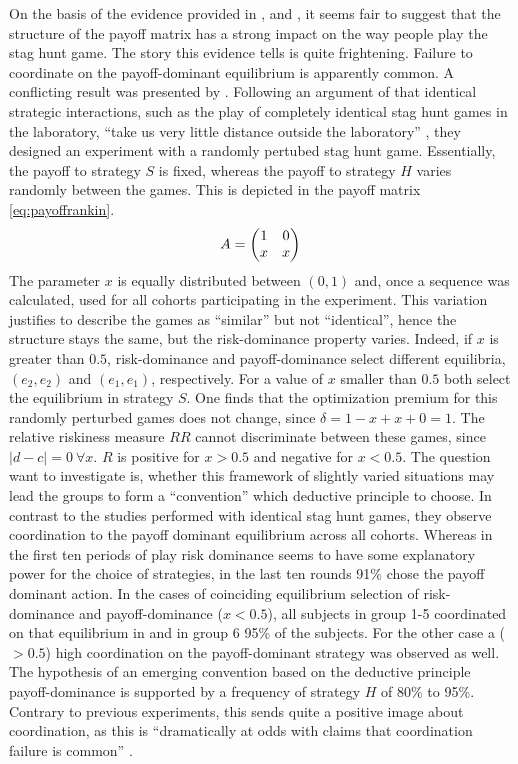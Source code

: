 On the basis of the evidence provided in \textcite{battalio_optimization_2001},
\textcite{schmidt_playing_2003} and \textcite{dubois_optimization_2012},
it seems fair to suggest that the structure of the payoff matrix has a 
strong impact on the way people play the stag hunt game.   
The story this evidence tells is quite frightening. Failure to coordinate 
on the payoff-dominant equilibrium is apparently common. 
A conflicting result was presented by \textcite{rankin_strategic_2000}.
Following an argument of \textcite{kreps_game_1990} that identical strategic 
interactions, such as the play of completely identical stag hunt games 
in the laboratory, ``take us very little distance outside the laboratory'' 
\parencite[212]{kreps_game_1990}, 
they designed an experiment with a randomly 
pertubed stag hunt game. Essentially, the payoff to strategy $S$ is fixed, 
whereas the payoff to strategy $H$ varies randomly between the games. This is
depicted in the payoff matrix  \eqref{eq:payoffrankin}.
\begin{align}
        \label{eq:payoffrankin}
        A = \mqty(1 & 0 \\ x & x)
\end{align}        
The parameter $x$ is equally distributed between $(0,1)$ and, once a sequence
was calculated, used for all cohorts participating in the experiment. This
variation justifies to describe the games as ``similar'' but not
``identical'', hence the structure stays the same, but the risk-dominance 
property varies. Indeed, if $x$ is greater than $0.5$, risk-dominance and
payoff-dominance select different equilibria, $(e_2,e_2)$ and $(e_1,e_1)$,
respectively. For a value of $x$ smaller than $0.5$ both select 
the equilibrium in strategy $S$. One finds that the optimization premium for 
this randomly perturbed games does not change, since $\delta=1-x+x+0=1$. 
The relative riskiness measure $RR$ cannot discriminate between these games,
since $|d-c|=0\ \forall x$. $R$ is positive for $x > 0.5$ and 
negative for $x <0.5$. The question \textcite{rankin_strategic_2000}
want to investigate is, whether this framework of slightly varied situations may
lead the groups to form a ``convention'' which deductive principle to choose. 
In contrast to the studies performed with identical stag hunt games, they 
observe coordination to the payoff dominant equilibrium across
all cohorts. Whereas in the first ten periods of play risk dominance seems
to have some explanatory power for the choice of strategies, in the last ten
rounds 91\% chose the payoff dominant action. 
In the cases of coinciding equilibrium selection of risk-dominance and 
payoff-dominance ($x < 0.5$), all subjects in group 1-5 coordinated 
on that equilibrium in and in group 6 95\% of the subjects. 
For the other case a ($ >0.5$)
high coordination on the payoff-dominant strategy was observed as well.
The hypothesis of an emerging convention based on the deductive principle
payoff-dominance is supported by a frequency of strategy $H$ of 80\% to 95\%.
Contrary to previous experiments, this sends 
quite a positive image about coordination, as this is 
``dramatically at odds with claims that coordination failure is common''
\parencite[9]{devetag_when_2007}. 


